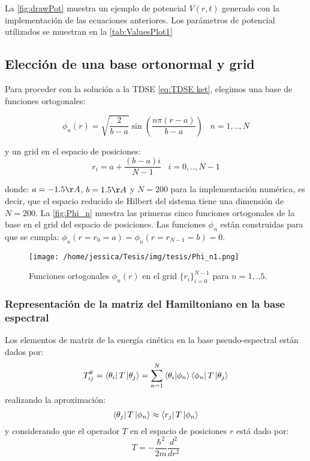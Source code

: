 La \autoref{fig:drawPot} muestra un ejemplo de potencial $V(r,t)$ generado con la implementación de las ecuaciones anteriores. Los parámetros de potencial utilizados se muestran en la \autoref{tab:ValuesPlot1}

\subsection{Elección de una base ortonormal y grid}

Para proceder con la solución a la \acs{TDSE} \autoref{eq:TDSE ket}, elegimos una base de funciones ortogonales: \cite{Colbert1992}

\begin{equation}
  \label{eq:eigenfunc}
  \phi_n(r)=\sqrt{\frac{2}{b-a}}\sin\left( \frac{n\pi(r-a)}{b-a}\right) \,\,\,\,\, n=1,..,N
\end{equation}

y un grid en el espacio de posiciones:
\begin{equation}
  \label{eq:grid}
  r_i = a + \frac{(b-a)i}{N-1} \,\,\,\,\, i=0,..,N-1
\end{equation}

donde: $a=-1.5\AA$, $b=1.5\AA$ y $N=200$ para la implementación numérica, es decir, que el espacio reducido de Hilbert del sistema tiene una dimensión de $N=200$. La \autoref{fig:Phi_n} muestra las primeras cinco funciones ortogonales de la base en el grid del espacio de posiciones. Las funciones $\phi_n$ están construidas para que se cumpla: $\phi_n(r=r_0=a)=\phi_n(r=r_{N-1}=b)=0$.

\begin{figure}[ht]
  \centering
  \texttt{[image: /home/jessica/Tesis/img/tesis/Phi\_n1.png]}
  \caption{Funciones ortogonales $\phi_n(r)$ en el grid $\{r_i\}_{i=0}^{N-1}$ para $n=1,..5$.}
  \label{fig:Phi_n}
\end{figure}

\subsubsection{Representación de la matriz del Hamiltoniano en la base espectral}

Los elementos de matriz de la energía cinética en la base pseudo-espectral están dados por:
\begin{equation}
  \label{eq:T}
T^{\theta}_{ij}= \bra{\theta_i}T\ket{\theta_j}=\sum_{n=1}^N\bra{\theta_i}\ket{\phi_n}\bra{\phi_n}T\ket{\theta_j}
\end{equation}
realizando la aproximación:
$$\bra{\theta_j}T\ket{\phi_n} \approx \bra{r_j}T\ket{\phi_n}$$
y considerando que el operador $T$ en el espacio de posiciones $r$ está dado por:
\begin{equation}
  \label{eq:Toperator}
  T = -\frac{\hbar^2}{2m}\frac{d^2}{dr^2}
\end{equation}


